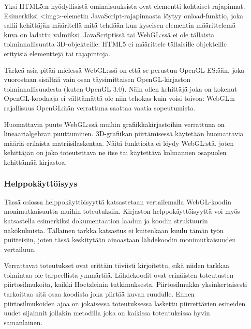 Yksi HTML5:n hyödyllisistä ominaisuuksista ovat elementti-kohtaiset rajapinnat. Esimerkiksi <img>-elemetin JavaScript-rajapinnasta löytyy onload-funktio, joka sallii kehittäjän määritellä mitä tehdään kun kyseisen elementin määrittelemä kuva on ladattu valmiiksi. JavaScriptissä tai WebGL:ssä ei ole tällaista toiminnallisuutta 3D-objekteille: HTML5 ei määrittele tällaisille objekteille erityisiä elementtejä tai rajapintoja.

Tärkeä asia pitää mielessä WebGL:ssä on että se perustuu OpenGL ES:ään, joka vuorostaan sisältää vain osan täysimittaisen OpenGL-kirjaston toiminnallisuudesta (kuten OpenGL 3.0)\cite{khronosopenwebgldiff}. Näin ollen kehittäjä joka on kokenut OpenGL-koodaaja ei välttämättä ole niin tehokas kuin voisi toivoa: WebGL:n rajallisuus OpenGL:ään verrattuna saattaa vaatia sopeutumista.

Huomattavin puute WebGL:ssä muihin grafiikkakirjastoihin verrattuna on lineaarialgebran puuttuminen. 3D-grafiikan piirtämisessä käytetään huomattavia määriä erilaista matriisilaskentaa. Näitä funktioita ei löydy WebGL:stä, joten kehittäjän on joko toteutettava ne itse tai käytettävä kolmannen osapuolen kehittämää kirjastoa.


\subsubsection{Helppokäyttöisyys}
Tässä osiossa helppokäyttöisyyttä katsastetaan vertailemalla WebGL-koodin monimutkaisuutta muihin toteutuksiin. Kirjaston helppokäyttöisyyttä voi myös katsastella esimerkiksi dokumentaation laadun ja koodin struktuurin näkökulmista. Tällainen tarkka katsastus ei kuitenkaan kuulu tämän työn puitteisiin, joten tässä keskitytään ainoastaan lähdekoodin monimutkaisuuden vertailuun.

Verrattavat toteutukset ovat erittäin tiiviisti kirjoitettu, eikä niiden tarkkaa toimintaa ole tarpeellista ymmärtää. Lähdekoodit ovat erinäisten toteutusten piirtosilmukoita, kaikki Hoetzleinin\cite{hoetzlein} tutkimuksesta. Piirtosilmukka yksinkertaisesti tarkoittaa sitä osaa koodista joka piirtää kuvan ruudulle. Ennen piirtosilmukoiden ajoa on jokaisessa toteutuksessa laskettu piirrettävien esineiden uudet sijainnit jollakin metodilla joka on kaikissa toteutuksissa hyvin samanlainen\cite{hoetzlein}. 

